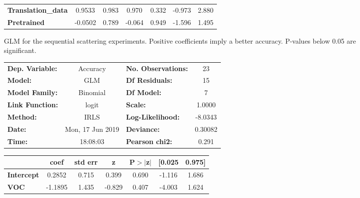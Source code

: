 \begin{figure}[!htb]
\begin{center}
\begin{tabular}{lcccccc}
			\textbf{Translation\_data} &       0.9533  &        0.983     &     0.970  &         0.332        &       -0.973    &        2.880     \\
			\textbf{Pretrained}        &      -0.0502  &        0.789     &    -0.064  &         0.949        &       -1.596    &        1.495     \\
			\bottomrule
		\end{tabular}
	\end{center}
\caption{GLM for the sequential scattering experiments. Positive coefficients imply a better accuracy. P-values below 0.05 are significant.}
\label{fig:GLM_sequential_scattering}
\end{figure}

\begin{figure}[!htb]
	\centering
	\begin{center}
		\begin{tabular}{lclc}
			\toprule
			\textbf{Dep. Variable:}    &     Accuracy     & \textbf{  No. Observations:  } &       23    \\
			\textbf{Model:}            &       GLM        & \textbf{  Df Residuals:      } &       15    \\
			\textbf{Model Family:}     &     Binomial     & \textbf{  Df Model:          } &        7    \\
			\textbf{Link Function:}    &      logit       & \textbf{  Scale:             } &    1.0000   \\
			\textbf{Method:}           &       IRLS       & \textbf{  Log-Likelihood:    } &   -8.0343   \\
			\textbf{Date:}             & Mon, 17 Jun 2019 & \textbf{  Deviance:          } &   0.30082   \\
			\textbf{Time:}             &     18:08:03     & \textbf{  Pearson chi2:      } &    0.291    \\
			\bottomrule
		\end{tabular}
		\begin{tabular}{lcccccc}
			& \textbf{coef} & \textbf{std err} & \textbf{z} & \textbf{P$>$$|$z$|$} & \textbf{[0.025} & \textbf{0.975]}  \\
			\midrule
			\textbf{Intercept}         &       0.2852  &        0.715     &     0.399  &         0.690        &       -1.116    &        1.686     \\
			\textbf{VOC}               &      -1.1895  &        1.435     &    -0.829  &         0.407        &       -4.003    &        1.624     \\

\end{tabular}
\end{center}
\end{figure}
